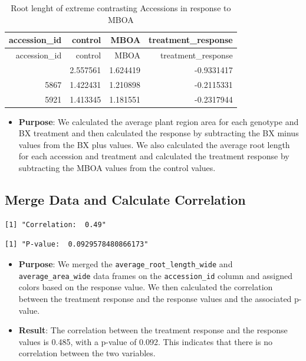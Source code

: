 \documentclass[
  11pt,
]{article}
\providecommand{\tightlist}{%
  \setlength{\itemsep}{0pt}\setlength{\parskip}{0pt}}\usepackage{longtable,booktabs,array}
\begin{document}
\begin{longtable}[]{@{}rrrr@{}}
\caption{Root lenght of extreme contrasting Accessions in response to
MBOA}\tabularnewline
\toprule\noalign{}
accession\_id & control & MBOA & treatment\_response \\
\midrule\noalign{}
\endfirsthead
\toprule\noalign{}
accession\_id & control & MBOA & treatment\_response \\
\midrule\noalign{}
\endhead
\bottomrule\noalign{}
\endlastfoot
506 & 2.557561 & 1.624419 & -0.9331417 \\
5867 & 1.422431 & 1.210898 & -0.2115331 \\
5921 & 1.413345 & 1.181551 & -0.2317944 \\
\end{longtable}

\begin{itemize}
\tightlist
\item
  \textbf{Purpose}: We calculated the average plant region area for each
  genotype and BX treatment and then calculated the response by
  subtracting the BX minus values from the BX plus values. We also
  calculated the average root length for each accession and treatment
  and calculated the treatment response by subtracting the MBOA values
  from the control values.
\end{itemize}

\subsection{Merge Data and Calculate
Correlation}\label{merge-data-and-calculate-correlation}

\begin{verbatim}
[1] "Correlation:  0.49"
\end{verbatim}

\begin{verbatim}
[1] "P-value:  0.0929578480866173"
\end{verbatim}

\begin{itemize}
\item
  \textbf{Purpose}: We merged the \texttt{average\_root\_length\_wide}
  and \texttt{average\_area\_wide} data frames on the
  \texttt{accession\_id} column and assigned colors based on the
  response value. We then calculated the correlation between the
  treatment response and the response values and the associated p-value.
\item
  \textbf{Result}: The correlation between the treatment response and
  the response values is 0.485, with a p-value of 0.092. This indicates
  that there is no correlation between the two variables.
\end{itemize}
\end{document}
